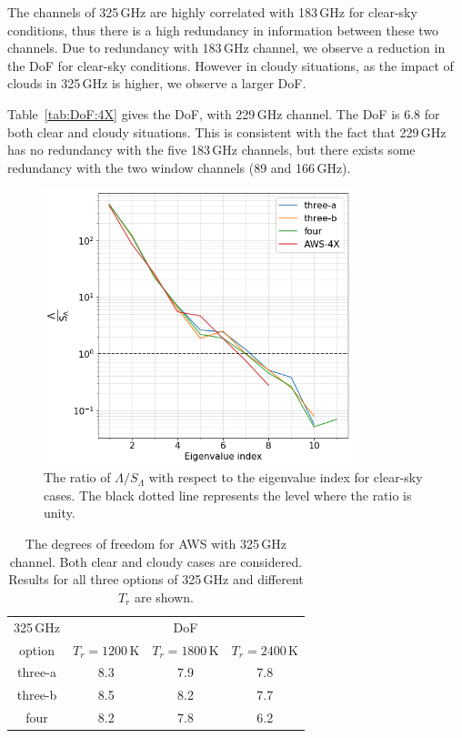 \documentclass[12pt]{article}
\begin{document}
The channels of 325\,GHz are highly correlated with 183\,GHz for clear-sky conditions, thus there is a high redundancy in information between these two channels. Due to redundancy with 183\,GHz channel, we observe a reduction in the DoF for clear-sky conditions. However in cloudy situations, as the impact of clouds in 325\,GHz is higher, we observe a larger DoF.

Table~\ref{tab:DoF:4X} gives the DoF, with 229\,GHz channel. The DoF is 6.8 for both clear and cloudy situations. This is consistent with the fact that 229\,GHz has no redundancy with the five 183\,GHz channels, but there exists some redundancy with the two window channels (89 and 166\,GHz). 

\begin{figure}[!tb]
	\centering
	\includegraphics[height=80mm]{DoF.png}
	\caption{ The ratio of $\Lambda/S_\Lambda$ with respect to the eigenvalue index for clear-sky cases. The black dotted line represents the level where the ratio is unity. }
	\label{fig:DoF:clear:1200K}
\end{figure}

\begin{table}[!p]
	\centering
	\begin{tabular}[b]{c|c|c|c}
		 325\,GHz & \multicolumn{3}{c}{DoF}   \\
		 option &  $T_r = 1200 $\,K &   $T_r = 1800 $\,K &   $T_r = 2400$\,K \\
		\hline
		three-a &              8.3 &              7.9 &              7.8 \\		
		three-b &              8.5 &              8.2 &              7.7 \\		
		four    &              8.2 &              7.8 &              6.2 \\

		\hline
	\end{tabular}
	\caption{The degrees of freedom for AWS with 325\,GHz channel. Both clear and cloudy cases are considered. Results for all three options of 325\,GHz and different $T_r$ are shown.    }
	\label{tab:DoF:all}
\end{table}
\end{document}
